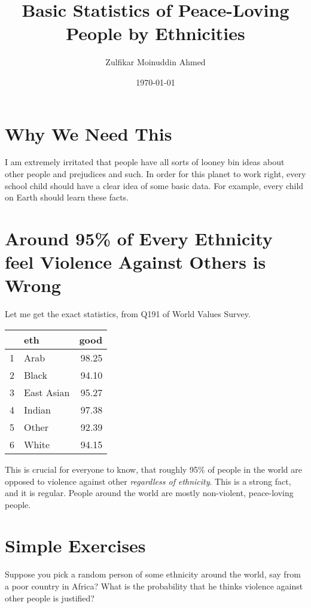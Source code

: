 \documentclass{amsart}
\title{Basic Statistics of Peace-Loving People by Ethnicities}
\author{Zulfikar Moinuddin Ahmed}
\date{\today}
\begin{document}
\maketitle

\section{Why We Need This}

I am extremely irritated that people have all sorts of looney bin ideas about other people and prejudices and such.  In order for this planet to work right, every school child should have a clear idea of some basic data.  For example, every child on Earth should learn these facts.

\section{Around 95\% of Every Ethnicity feel Violence Against Others is Wrong}

Let me get the exact statistics, from Q191 of World Values Survey.

\begin{table}[ht]
\centering
\begin{tabular}{rlr}
  \hline
 & eth & good \\ 
  \hline
1 & Arab & 98.25 \\ 
  2 & Black & 94.10 \\ 
  3 & East Asian & 95.27 \\ 
  4 & Indian & 97.38 \\ 
  5 & Other & 92.39 \\ 
  6 & White & 94.15 \\ 
   \hline
\end{tabular}
\end{table}

This is crucial for everyone to know, that roughly 95\% of people in the world are opposed to violence against other {\em regardless of ethnicity}.  This is a strong fact, and it is regular.  People around the world are mostly non-violent, peace-loving people.

\section{Simple Exercises}

Suppose you pick a random person of some ethnicity around the world, say from a poor country in Africa?  What is the probability that he thinks violence against other people is justified?  
\end{document}
